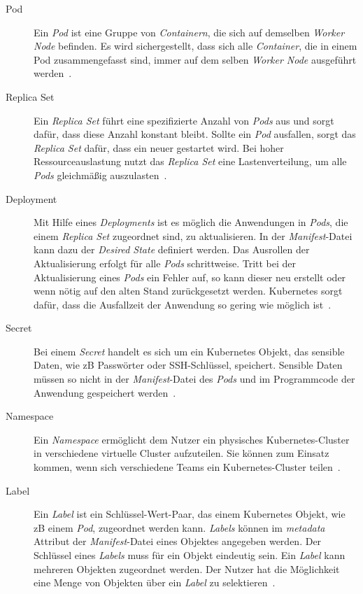 \begin{description}
      \item[Pod]
            Ein \textit{Pod} ist eine Gruppe von \textit{Containern}, die sich auf demselben \textit{Worker Node} befinden.
            Es wird sichergestellt, dass sich alle \textit{Container}, die in einem Pod zusammengefasst sind,
            immer auf dem selben \textit{Worker Node} ausgeführt werden~\cite{kubernetes-objects-kodekloud,kubernetes-in-action-chapter-3}.
      \item[Replica Set]
            Ein \textit{Replica Set} führt eine spezifizierte Anzahl von \textit{Pods} aus und sorgt dafür, dass diese Anzahl konstant bleibt.
            Sollte ein \textit{Pod} ausfallen, sorgt das \textit{Replica Set} dafür, dass ein neuer gestartet wird. Bei hoher Ressourceauslastung
            nutzt das \textit{Replica Set} eine Lastenverteilung, um alle \textit{Pods} gleichmäßig auszulasten~\cite{kubernetes-replica-set-kubematic}.
      \item[Deployment]
            Mit Hilfe eines \textit{Deployments} ist es möglich die Anwendungen in \textit{Pods}, die einem \textit{Replica Set} zugeordnet sind, zu aktualisieren.
            In der \textit{Manifest}-Datei kann dazu der \textit{Desired State} definiert werden.
            Das Ausrollen der Aktualisierung erfolgt für alle \textit{Pods} schrittweise.
            Tritt bei der Aktualisierung eines \textit{Pods} ein Fehler auf, so kann dieser neu erstellt oder wenn nötig auf den alten Stand zurückgesetzt werden.
            Kubernetes sorgt dafür, dass die Ausfallzeit der Anwendung so gering wie möglich ist~\cite{kubernetes-in-action-chapter-9,kubernetes-deployment-vmware}.
      \item[Secret]
            Bei einem \textit{Secret} handelt es sich um ein Kubernetes Objekt, das sensible Daten, wie \ac{zB} Passwörter oder SSH-Schlüssel, speichert.
            Sensible Daten müssen so nicht in der \textit{Manifest}-Datei des \textit{Pods} und im Programmcode der Anwendung gespeichert werden~\cite{kubernetes-secrets,kubernetes-secrets-medium}.
      \item[Namespace]
            Ein \textit{Namespace} ermöglicht dem Nutzer ein physisches Kubernetes-Cluster in verschiedene virtuelle Cluster aufzuteilen.
            Sie können zum Einsatz kommen, wenn sich verschiedene Teams ein Kubernetes-Cluster teilen~\cite{kubernetes-namespaces-vmware}.
      \item[Label]
            Ein \textit{Label} ist ein Schlüssel-Wert-Paar, das einem Kubernetes Objekt, wie \ac{zB} einem \textit{Pod}, zugeordnet werden kann.
            \textit{Labels} können im \textit{metadata} Attribut der \textit{Manifest}-Datei eines Objektes angegeben werden.
            Der Schlüssel eines \textit{Labels} muss für ein Objekt eindeutig sein. Ein \textit{Label} kann mehreren Objekten zugeordnet werden.
            Der Nutzer hat die Möglichkeit eine Menge von Objekten über ein \textit{Label} zu selektieren~\cite{kubernetes-labels}.
\end{description}

